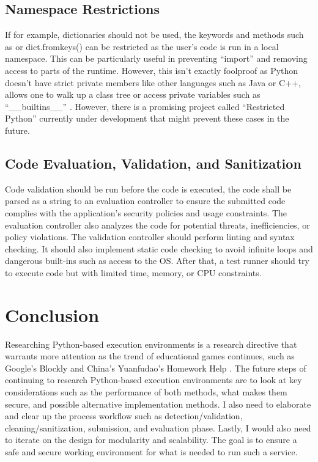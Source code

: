 \subsection{Namespace Restrictions}
If for example, dictionaries should not be used, the keywords and methods such as {} or dict.fromkeys() can be restricted as the user’s code is run in a local namespace. This can be particularly useful in preventing “import” and removing access to parts of the runtime. 
However, this isn’t exactly foolproof as Python doesn't have strict private members like other languages such as Java or C++, allows one to walk up a class tree or access private variables such as “\_\_builtins\_\_” \cite{stackexchange_untrusted_python}. However, there is a promising project called “Restricted Python” \cite{restricted_python} currently under development that might prevent these cases in the future. 
\subsection{Code Evaluation, Validation, and Sanitization}
Code validation should be run before the code is executed, the code shall be parsed as a string to an evaluation controller to ensure the submitted code complies with the application's security policies and usage constraints. The evaluation controller also analyzes the code for potential threats, inefficiencies, or policy violations.
The validation controller should perform linting and syntax checking. It should also implement static code checking to avoid infinite loops and dangerous built-ins such as access to the OS. After that, a test runner should try to execute code but with limited time, memory, or CPU constraints.




\section{Conclusion}
Researching Python-based execution environments is a research directive that warrants more attention as the trend of educational games continues, such as Google’s Blockly \cite{google_blockly} and China’s Yuanfudao's Homework Help \cite{xiaoyuan_kousuan}.
The future steps of continuing to research Python-based execution environments are to look at key considerations such as the performance of both methods, what makes them secure, and possible alternative implementation methods. I also need to elaborate and clear up the process workflow such as detection/validation, cleaning/sanitization, submission, and evaluation phase. Lastly, I would also need to iterate on the design for modularity and scalability. The goal is to ensure a safe and secure working environment for what is needed to run such a service.